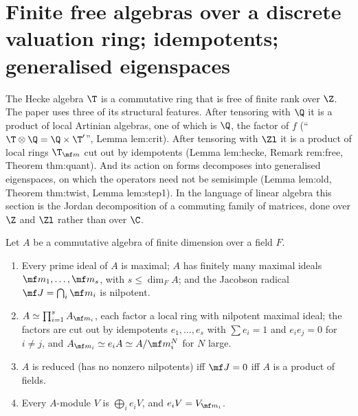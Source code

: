 \section[Finite free algebras and generalised eigenspaces]{Finite free algebras over a discrete valuation ring; idempotents; generalised eigenspaces}\label{sec:modules:algebras}

The Hecke algebra $\T$ is a commutative ring that is free of finite rank over $\Z$. The paper uses three of its structural features. After
tensoring with $\Q$ it is a product of local Artinian algebras, one of which is $\Q$, the factor of $f$ (``$\T\otimes\Q=\Q\times\T'$'', Lemma lem:crit).
After tensoring with $\Zl$ it is a product of local rings $\T_{\mf m}$ cut out by idempotents (Lemma lem:hecke, Remark rem:free, Theorem thm:quant).
And its action on forms decomposes into generalised eigenspaces, on which the operators need not be semisimple (Lemma lem:old, Theorem
thm:twist, Lemma lem:step1). In the language of linear algebra this section is the Jordan decomposition of a commuting family of
matrices, done over $\Z$ and $\Zl$ rather than over $\C$.

\begin{theorem}\label{thm:modules:artinian-algebras}
Let $A$ be a commutative algebra of finite dimension over a field $F$.
\begin{enumerate}[label=(\roman*)]
\item Every prime ideal of $A$ is maximal; $A$ has finitely many maximal ideals $\mf m_1,\dots,\mf m_s$, with $s\le\dim_FA$; and the Jacobson radical
$\mf J=\bigcap_i\mf m_i$ is nilpotent.
\item $A\simeq\prod_{i=1}^sA_{\mf m_i}$, each factor a local ring with nilpotent maximal ideal; the factors are cut out by idempotents $e_1,\dots,e_s$ with
$\sum e_i=1$ and $e_ie_j=0$ for $i\ne j$, and $A_{\mf m_i}\simeq e_iA\simeq A/\mf m_i^N$ for $N$ large.
\item $A$ is reduced (has no nonzero nilpotents) iff $\mf J=0$ iff $A$ is a product of fields.
\item Every $A$-module $V$ is $\bigoplus_ie_iV$, and $e_iV=V_{\mf m_i}$.
\end{enumerate}
\end{theorem}

